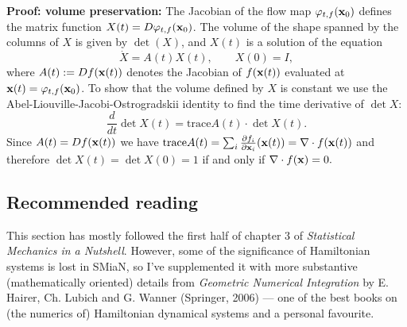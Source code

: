 \documentclass{article}
\begin{document}
{\bf Proof: volume preservation:}
The Jacobian of the flow map $\varphi_{t,f}({\bf x}_0)$ defines the matrix function $X(t)=D\varphi_{t,f}({\bf x}_0)$. The volume of the shape spanned by the columns of $X$ is given by $\det(X)$, and $X(t)$ is a solution of the equation
$$
\dot{X}=A(t)X(t),\qquad X(0)=I,
$$
where $A(t):=Df({\bf x}(t))$ denotes the Jacobian of $f({\bf x}(t))$ evaluated at ${\bf x}(t)=\varphi_{t,f}({\bf x}_0)$. To show that the volume defined by $X$ is constant we use  the Abel-Liouville-Jacobi-Ostrogradskii identity to find the time derivative of $\det X$:
$$
\frac{d}{dt}\det X(t)=\text{trace} A(t)\cdot\det X(t).
$$
Since $A(t)=Df({\bf x}(t))$ we have $\text{trace} A(t)=\sum_i\frac{\partial f_i}{\partial {\bf x}_i}({\bf x}(t))=\nabla\cdot f({\bf x}(t))$ and therefore $\det X(t)=\det X(0)=1$ if and only if $\nabla\cdot f({\bf x})=0.$

\subsection*{Recommended reading}
This section has mostly followed the first half of chapter 3 of \emph{Statistical Mechanics in a Nutshell}. However, some of the significance of Hamiltonian systems is lost in SMiaN, so I've supplemented it with more substantive (mathematically oriented) details from \emph{Geometric Numerical Integration} by E. Hairer, Ch. Lubich and G. Wanner (Springer, 2006) --- one of the best books on (the numerics of) Hamiltonian dynamical systems and a personal favourite.
\end{document}
